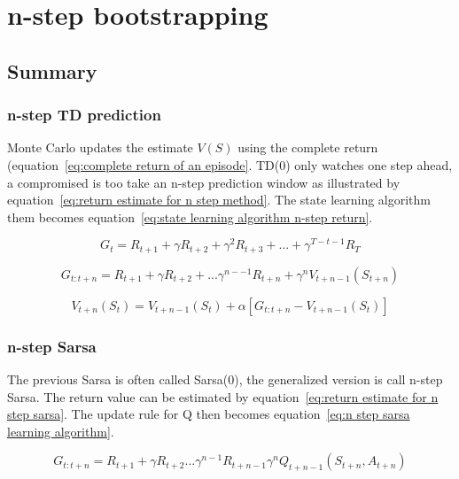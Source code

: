 \chapter{n-step bootstrapping}
\section{Summary}

\subsection{n-step TD prediction}

Monte Carlo updates the estimate $V(S)$ using the complete return (equation~\ref{eq:complete return of an episode}. TD(0) only watches one step ahead, a compromised is too take an n-step prediction window as illustrated by equation~\ref{eq:return estimate for n step method}. The state learning algorithm them becomes equation~\ref{eq:state learning algorithm n-step return}.

\begin{equation}
G_t = R_{t+1} + \gamma R_{t+2} + \gamma^2 R_{t+3} + ... + \gamma^{T-t-1}R_T
\label{eq:complete return of an episode}
\end{equation}

\begin{equation}
G_{t:t+n} = R_{t+1} + \gamma R_{t+2} + ... \gamma^{n--1} R_{t+n} + \gamma^nV_{t+n-1}(S_{t+n})
\label{eq:return estimate for n step method}
\end{equation}

\begin{equation}
V_{t+n}(S_t) = V_{t+n-1}(S_t) + \alpha [G_{t:t+n} - V_{t+n-1}(S_t)]
\label{eq:state learning algorithm n-step return}
\end{equation}

\subsection{n-step Sarsa}

The previous Sarsa is often called Sarsa(0), the generalized version is call n-step Sarsa. The return value can be estimated by equation~\ref{eq:return estimate for n step sarsa}. The update rule for Q then becomes equation~\ref{eq:n step sarsa learning algorithm}.

\begin{equation}
G_{t:t+n} = R_{t+1} + \gamma R_{t+2} ... \gamma^{n-1} R_{t+n-1} \gamma^n Q_{t+n-1}(S_{t+n}, A_{t+n})
\label{eq:return estimate for n step sarsa}
\end{equation}

